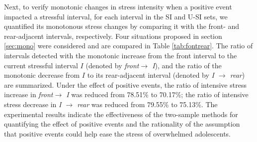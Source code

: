 Next,
to verify monotonic changes in stress intensity when a positive event impacted a stressful interval,
for each interval in the SI and U-SI sets,
we quantified its monotonous stress changes by comparing it with the front- and rear-adjacent intervals, respectively.
Four situations proposed in section \ref{sec:mono} were considered and are compared in Table \ref{tab:fontrear}.
The ratio of intervals detected with the monotonic increase from the front interval to the current stressful interval $I$
(denoted by \emph{front$ \rightarrow$ I}),
and the ratio of the monotonic decrease from $I$ to its rear-adjacent interval (denoted by \emph{I $\rightarrow$ rear}) are summarized.
Under the effect of positive events, 
the ratio of intensive stress increase in \emph{front$ \rightarrow$ I} was reduced from 78.51\% to 70.17\%;
the ratio of intensive stress decrease in \emph{I $\rightarrow$ rear} was reduced from 79.55\% to 75.13\%. 
The experimental results indicate the effectiveness of the two-sample methods for quantifying the effect of positive events 
and the rationality of the assumption that positive events could help ease the stress of overwhelmed adolescents.


